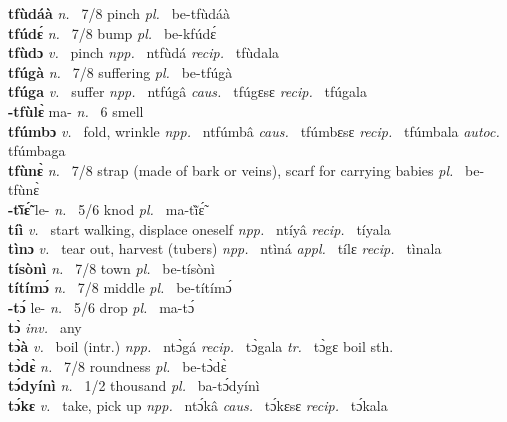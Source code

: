 {\bfseries tfùdáà}  {\itshape n.~} 7/8 pinch {\itshape pl.~} be-tfùdáà    \\ 
{\bfseries tfúdɛ́}  {\itshape n.~} 7/8 bump {\itshape pl.~} be-kfúdɛ́    \\ 
{\bfseries tfùdɔ}  {\itshape v.~} pinch   {\itshape npp.~} ntfùdá {\itshape recip.~} tfùdala  \\ 
{\bfseries tfúgà}  {\itshape n.~} 7/8 suffering {\itshape pl.~} be-tfúgà    \\ 
{\bfseries tfúga}  {\itshape v.~} suffer   {\itshape npp.~} ntfúgâ {\itshape caus.~} tfúgɛsɛ {\itshape recip.~} tfúgala  \\ 
{\bfseries -tfùlɛ̀} ma- {\itshape n.~} 6 smell    \\ 
{\bfseries tfúmbɔ}  {\itshape v.~} fold, wrinkle   {\itshape npp.~} ntfúmbâ {\itshape caus.~} tfúmbɛsɛ {\itshape recip.~} tfúmbala {\itshape autoc.~} tfúmbaga  \\ 
{\bfseries tfùnɛ̀}   {\itshape n.~} 7/8 strap (made of bark or veins), scarf for carrying babies {\itshape pl.~} be-tfùnɛ̀    \\ 
{\bfseries -tĩ̀ɛ̃́} le- {\itshape n.~} 5/6 knod {\itshape pl.~} ma-tĩ̀ɛ̃́    \\ 
{\bfseries tíì}  {\itshape v.~} start walking, displace oneself   {\itshape npp.~} ntíyâ {\itshape recip.~} tíyala  \\ 
{\bfseries tìnɔ}  {\itshape v.~} tear out, harvest (tubers)   {\itshape npp.~} ntìná {\itshape appl.~} tílɛ {\itshape recip.~} tìnala  \\ 
{\bfseries tísònì}  {\itshape n.~} 7/8 town {\itshape pl.~} be-tísònì    \\ 
{\bfseries títímɔ́}  {\itshape n.~} 7/8 middle {\itshape pl.~} be-títímɔ́    \\ 
{\bfseries -tɔ́} le- {\itshape n.~} 5/6 drop {\itshape pl.~} ma-tɔ́    \\ 
{\bfseries tɔ̀}  {\itshape inv.~} any    \\ 
{\bfseries tɔ̀à }  {\itshape v.~} boil (intr.)   {\itshape npp.~} ntɔ̀gá {\itshape recip.~} tɔ̀gala {\itshape tr.~} tɔ̀gɛ boil sth. \\ 
{\bfseries tɔ̀dɛ̀}  {\itshape n.~} 7/8 roundness {\itshape pl.~} be-tɔ̀dɛ̀    \\ 
{\bfseries tɔ́dyínì}  {\itshape n.~} 1/2 thousand {\itshape pl.~} ba-tɔ́dyínì    \\ 
{\bfseries tɔ́kɛ}  {\itshape v.~} take, pick up   {\itshape npp.~} ntɔ́kâ {\itshape caus.~} tɔ́kɛsɛ {\itshape recip.~} tɔ́kala  \\ 
